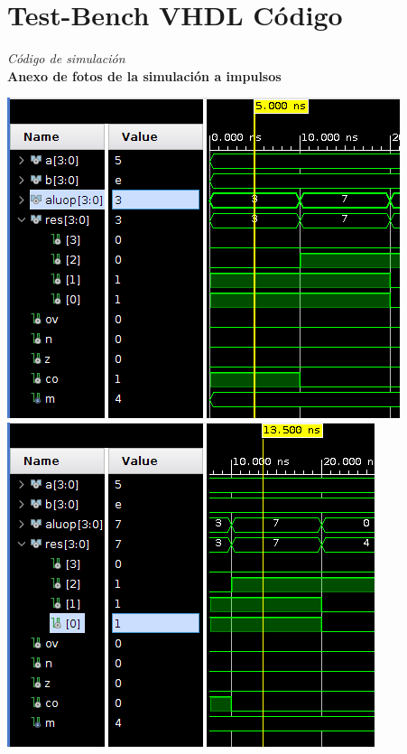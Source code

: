 \documentclass[12pt,executivepaper]{article}
\begin{document}
\section{Test-Bench VHDL Código}
\begin{center}
    
    \textit{Código de simulación}\\
    \textbf{Anexo de fotos de la simulación a impulsos}
\end{center}
\begin{center}
    \includegraphics[scale=0.666]{imgs/uno.png}\\
    \includegraphics[scale=0.666]{imgs/dos.png}\\

\end{center}
\end{document}
